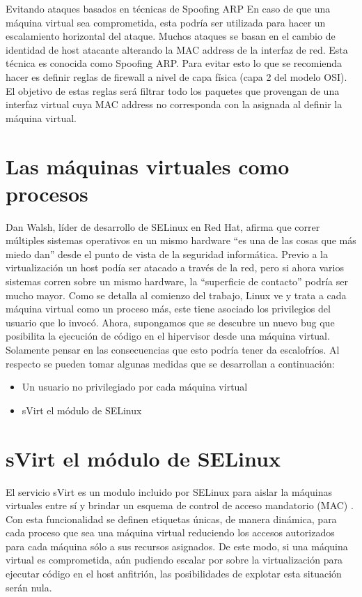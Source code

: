 	Evitando ataques basados en técnicas de Spoofing ARP En caso de que una máquina virtual sea comprometida, esta podría ser utilizada para hacer un escalamiento horizontal del ataque. Muchos ataques se basan en el cambio de identidad de host atacante alterando la MAC address de la interfaz de red. Esta técnica es conocida como Spoofing ARP. \newline
	Para evitar esto lo que se recomienda hacer es definir reglas de firewall a nivel de capa física (capa 2 del modelo OSI). El objetivo de estas reglas será filtrar todo los paquetes que provengan de una interfaz virtual cuya MAC address no corresponda con la asignada al definir la máquina virtual. \newline
	
	\section{Las máquinas virtuales como procesos}
	Dan Walsh, líder de desarrollo de SELinux en Red Hat, afirma que correr múltiples sistemas operativos en un mismo hardware “es una de las cosas que más miedo dan” desde el punto de vista de la seguridad informática\cite{7}. Previo a la virtualización un host podía ser atacado a través de la red, pero si ahora varios sistemas corren sobre un mismo hardware, la “superficie de contacto” podría ser mucho mayor. \newline
	Como se detalla al comienzo del trabajo, Linux ve y trata a cada máquina virtual como un proceso más, este tiene asociado los privilegios del usuario que lo invocó. Ahora, supongamos que se descubre un nuevo bug que posibilita la ejecución de código en el hipervisor desde una máquina virtual. Solamente pensar en las consecuencias que esto podría tener da escalofríos.
	Al respecto se pueden tomar algunas medidas que se desarrollan a continuación:
	
	\begin{itemize}
		\item Un usuario no privilegiado por cada máquina virtual
		\item sVirt el módulo de SELinux
	\end{itemize}
	
\section{sVirt el módulo de SELinux}
	El servicio sVirt es un modulo incluido por SELinux para aislar la
	máquinas virtuales entre sí y brindar un esquema de control de acceso
	mandatorio (MAC) \cite{4}. Con esta funcionalidad se definen etiquetas únicas,
	de manera dinámica, para cada proceso que sea una máquina virtual
reduciendo los accesos autorizados para cada máquina sólo a sus recursos
asignados. De este modo, si una máquina virtual es comprometida, aún
	pudiendo escalar por sobre la virtualización para ejecutar código en el host
anfitrión, las posibilidades de explotar esta situación serán nula.
\newline
	
